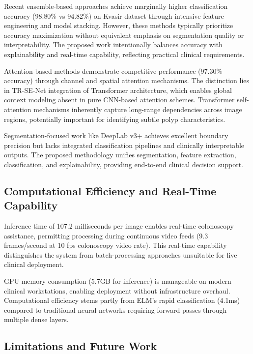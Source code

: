 \documentclass[11pt,a4paper]{article}
\begin{document}
Recent ensemble-based approaches \cite{ref22} achieve marginally higher classification accuracy (98.80\% vs 94.82\%) on Kvasir dataset through intensive feature engineering and model stacking. However, these methods typically prioritize accuracy maximization without equivalent emphasis on segmentation quality or interpretability. The proposed work intentionally balances accuracy with explainability and real-time capability, reflecting practical clinical requirements.

Attention-based methods \cite{ref23} demonstrate competitive performance (97.30\% accuracy) through channel and spatial attention mechanisms. The distinction lies in TR-SE-Net integration of Transformer architecture, which enables global context modeling absent in pure CNN-based attention schemes. Transformer self-attention mechanisms inherently capture long-range dependencies across image regions, potentially important for identifying subtle polyp characteristics.

Segmentation-focused work like DeepLab v3+ \cite{ref24} achieves excellent boundary precision but lacks integrated classification pipelines and clinically interpretable outputs. The proposed methodology unifies segmentation, feature extraction, classification, and explainability, providing end-to-end clinical decision support.

\subsection{Computational Efficiency and Real-Time Capability}

Inference time of 107.2 milliseconds per image enables real-time colonoscopy assistance, permitting processing during continuous video feeds (9.3 frames/second at 10 fps colonoscopy video rate). This real-time capability distinguishes the system from batch-processing approaches unsuitable for live clinical deployment.

GPU memory consumption (5.7GB for inference) is manageable on modern clinical workstations, enabling deployment without infrastructure overhaul. Computational efficiency stems partly from ELM's rapid classification (4.1ms) compared to traditional neural networks requiring forward passes through multiple dense layers.

\subsection{Limitations and Future Work}
\end{document}
